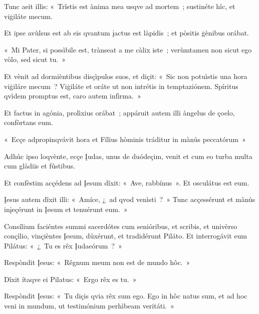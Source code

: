 Tunc aeit illis: «~Trîstis est ànima mea usqve ad mortem~; sustinéte hîc, et viģiláte mecum. 

Et ipse avùlsus est ab eis qvantum įactus est làpidis~; et pòsitis ģènibus orábat. 

«~Mi Pater, si possìbile est, trànseat a me càlix iste~; verùmtamen non sicut ego vòlo, sed sicut tu.~» 

Et vènit ad dormièntibus disçìpulos suos, et diçit: «~Sic non potuìstis una hora viģiláre mecum~? Viģiláte et oráte ut non intrétis in temptaziónem. Spíritus qvìdem promptus est, caro autem infìrma.~» 

Et factus in agónia, prolìxius orábat~; appáruit autem illi àngelus de çoelo, confòrtans eum. 

«~Ecçe adpropinqvávit hora et Fílius hòminis tráditur in mànůs peccatórum~» 

Adhůc ipso loqvènte, ecçe Įudas, unus de duódeçim, venit et cum eo turba multa cum glàdiis et fûstibus. 

Et confèstim acçédens ad Įesum dîxit: «~Ave, rabbínus~». Et osculátus est eum. 

Įesus autem dîxit illi: «~Amíce, ¿~ad qvod venìsti~?~» Tunc acçessérunt et mànůs inįeçérunt in Įesum et tenuérunt eum.~» 


Consílium faciéntes summi sacerdótes cum senióribus, et scribis, et univèrso conçìlio, vinçièntes Įesum, důxérunt, et tradidérunt Piláto. Et interrogávit eum Pilátus: «~¿~Tu es rêx Įudaeórum~?~» 

Respòndit Įesus: «~Rêgnum meum non est de mundo hôc.~» 

Dîxit ítaqve ei Pilatus: «~Ergo rêx es tu.~» 

Respòndit Įesus: «~Tu diçis qvia rêx sum ego. Ego in hôc natus sum, et ad hoc veni in mundum, ut testimónium perhìbeam veritáti.~» 


